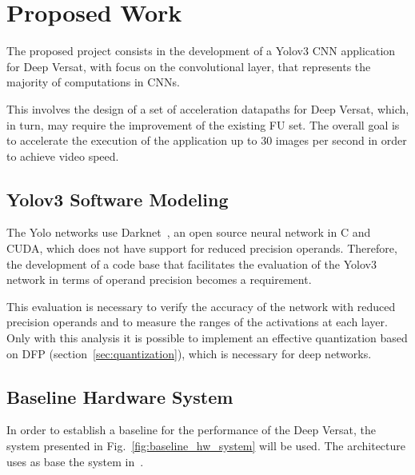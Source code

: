 
\chapter{Proposed Work}
\label{chapter:implementation}

The proposed project consists in the development of a Yolov3 CNN application for
Deep Versat, with focus on the convolutional layer, that represents the majority
of computations in CNNs.

This involves the design of a set of acceleration datapaths for Deep Versat,
which, in turn, may require the improvement of the existing FU set. The overall
goal is to accelerate the execution of the application up to 30 images per
second in order to achieve video speed.


\section{Yolov3 Software Modeling}
\label{sec:yolov3_baseline}
The Yolo networks use Darknet~\cite{darknet13}, an open source neural network in
C and CUDA, which does not have support for reduced precision
operands. Therefore, the development of a code base that facilitates the
evaluation of the Yolov3 network in terms of operand precision becomes a
requirement.

This evaluation is necessary to verify the accuracy of the network with reduced
precision operands and to measure the ranges of the activations at each
layer. Only with this analysis it is possible to implement an effective
quantization based on DFP (section~\ref{sec:quantization}), which is necessary
for deep networks.


\section{Baseline Hardware System}
\label{sec:hw_baseline}
In order to establish a baseline for the performance of the Deep Versat, the
system presented in Fig.~\ref{fig:baseline_hw_system} will be used. The
architecture uses as base the system in~\cite{VMario:Deep_Versat}.

